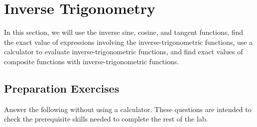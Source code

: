 
\section{Inverse Trigonometry} \label{section-inverse-trig}
In this section, we will use the inverse sine, cosine, and tangent functions, find the exact value of expressions involving the inverse-trigonometric functions, use a calculator to evaluate inverse-trigonometric functions, and find exact values of composite functions with inverse-trigonometric functions.


\subsection*{Preparation Exercises} \label{preparation-exercises-section-inverse-trig}

Answer the following without using a calculator. These questions are intended to check the prerequisite skills needed to complete the rest of the lab.


